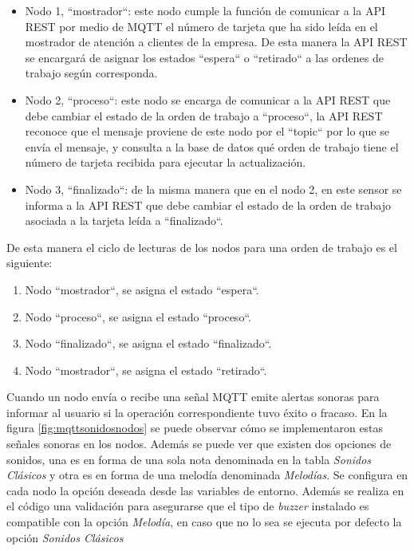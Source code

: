 \begin{itemize}
\item Nodo 1, ``mostrador``: este nodo cumple la función de comunicar a la API REST por medio de MQTT el número de tarjeta que ha sido leída en el mostrador de atención a clientes de la empresa. De esta manera la API REST se encargará de asignar los estados ``espera`` o ``retirado`` a las ordenes de trabajo según corresponda.

\item Nodo 2, ``proceso``: este nodo se encarga de comunicar a la API REST que debe cambiar el estado de la orden de trabajo a ``proceso``, la API REST reconoce que el mensaje proviene de este nodo por el ``topic`` por lo que se envía el mensaje, y consulta a la base de datos qué orden de trabajo tiene el número de tarjeta recibida para ejecutar la actualización.

\item Nodo 3, ``finalizado``: de la misma manera que en el nodo 2, en este sensor se informa a la API REST que debe cambiar el estado de la orden de trabajo asociada a la tarjeta leída a ``finalizado``.
\end{itemize}

De esta manera el ciclo de lecturas de los nodos para una orden de trabajo es el siguiente: 

\begin{enumerate}
\item Nodo ``mostrador``, se asigna el estado ``espera``.
\item Nodo ``proceso``, se asigna el estado ``proceso``.
\item Nodo ``finalizado``, se asigna el estado ``finalizado``.
\item Nodo ``mostrador``, se asigna el estado ``retirado``.
\end{enumerate}

Cuando un nodo envía o recibe una señal MQTT emite alertas sonoras para informar al usuario si la operación correspondiente tuvo éxito o fracaso. En la figura \ref{fig:mqttsonidosnodos} se puede observar cómo se implementaron estas señales sonoras en los nodos. Además se puede ver que existen dos opciones de sonidos, una es en forma de una sola nota denominada en la tabla \textit{Sonidos Clásicos} y otra es en forma de una melodía denominada \textit{Melodías}. Se configura en cada nodo la opción deseada desde las variables de entorno. Además se realiza en el código una validación para asegurarse que el tipo de \textit{buzzer} instalado es compatible con la opción \textit{Melodía}, en caso que no lo sea se ejecuta por defecto la opción \textit{Sonidos Clásicos}

